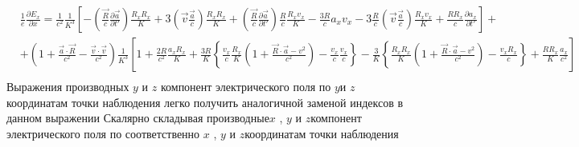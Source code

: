 \documentclass[11pt]{article}
\begin{document}
\[\begin{align}
  & \frac{1}{e}\frac{\partial {{E}_{x}}}{\partial x}=\frac{1}{{{c}^{2}}}\frac{1}{{{K}^{3}}}\left[ -\left( \frac{\overrightarrow{R}}{c}\frac{\partial \overrightarrow{a}}{\partial t'} \right)\frac{{{R}_{x}}{{R}_{x}}}{K}+3\left( \overrightarrow{v}\frac{\overrightarrow{a}}{c} \right)\frac{{{R}_{x}}{{R}_{x}}}{K}+\left( \frac{\overrightarrow{R}}{c}\frac{\partial \overrightarrow{a}}{\partial t'} \right)\frac{R}{c}\frac{{{R}_{x}}{{v}_{x}}}{K}-\frac{3R}{c}{{a}_{x}}{{v}_{x}}-3\frac{R}{c}\left( \overrightarrow{v}\frac{\overrightarrow{a}}{c} \right)\frac{{{R}_{x}}{{v}_{x}}}{K}+\frac{R{{R}_{x}}}{c}\frac{\partial {{a}_{x}}}{\partial t'} \right]+ \\ 
 & +\left( 1+\frac{\overrightarrow{a}\cdot \overrightarrow{R}}{{{c}^{2}}}-\frac{\overrightarrow{v}\cdot \overrightarrow{v}}{{{c}^{2}}} \right)\frac{1}{{{K}^{3}}}\left[ 1+\frac{2R}{{{c}^{2}}}\frac{{{a}_{x}}{{R}_{x}}}{K}+\frac{3R}{K}\left\{ \frac{{{v}_{x}}}{c}\frac{{{R}_{x}}}{K}\left( 1+\frac{\overrightarrow{R}\cdot \overrightarrow{a}-{{v}^{2}}}{{{c}^{2}}} \right)-\frac{{{v}_{x}}}{c}\frac{{{v}_{x}}}{c} \right\}-\frac{3}{K}\left\{ \frac{{{R}_{x}}{{R}_{x}}}{K}\left( 1+\frac{\overrightarrow{R}\cdot \overrightarrow{a}-{{v}^{2}}}{{{c}^{2}}} \right)-\frac{{{v}_{x}}{{R}_{x}}}{c} \right\}+\frac{R{{R}_{x}}}{K}\frac{{{a}_{x}}}{{{c}^{2}}} \right] \\ 
\end{align}\] Выражения производных \(y\) и \(z\) компонент
электрического поля по \(y\)и \(z\) координатам точки наблюдения легко
получить аналогичной заменой индексов в данном выражении Скалярно
складывая производные\(x\) , \(y\) и \(z\)компонент электрического поля
по соответственно \(x\) , \(y\) и \(z\)координатам точки наблюдения
\end{document}
